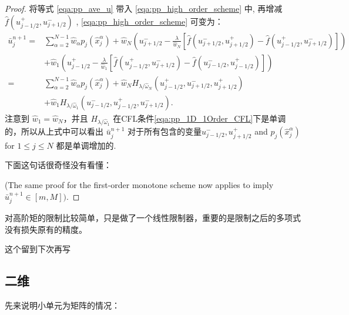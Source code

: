 \documentclass{book}
\begin{document}
\begin{proof}
    将等式 \eqref{eqa:pp_ave_u} 带入 \eqref{eqa:pp_high_order_scheme} 中, 再增减  $\hat{f}\left(u_{j-1 / 2}^{+}, u_{j+1 / 2}^{-}\right)$ , \eqref{eqa:pp_high_order_scheme} 可变为：
    \begin{equation}
        \begin{aligned}
            \bar{u}_{j}^{n+1}= & \sum_{\alpha=2}^{N-1} \hat{w}_{\alpha} p_{j}\left(\hat{x}_{j}^{\alpha}\right)+\hat{w}_{N}\left(u_{j+1 / 2}^{-}-\frac{\lambda}{\hat{w}_{N}}\left[\hat{f}\left(u_{j+1 / 2}^{-}, u_{j+1 / 2}^{+}\right)-\hat{f}\left(u_{j-1 / 2}^{+}, u_{j+1 / 2}^{-}\right)\right]\right) \\
                               & +\hat{w}_{1}\left(u_{j-1 / 2}^{+}-\frac{\lambda}{\hat{w}_{1}}\left[\hat{f}\left(u_{j-1 / 2}^{+}, u_{j+1 / 2}^{-}\right)-\hat{f}\left(u_{j-1 / 2}^{-}, u_{j-1 / 2}^{+}\right)\right]\right)                                                                              \\
            =                  & \sum_{\alpha=2}^{N-1} \hat{w}_{\alpha} p_{j}\left(\hat{x}_{j}^{\alpha}\right)+\hat{w}_{N} H_{\lambda / \hat{\omega}_{N}}\left(u_{j-1 / 2}^{+}, u_{j+1 / 2}^{-}, u_{j+1 / 2}^{+}\right)                                                                                  \\
                               & +\hat{w}_{1} H_{\lambda / \hat{\omega}_{1}}\left(u_{j-1 / 2}^{-}, u_{j-1 / 2}^{+}, u_{j+1 / 2}^{-}\right) .
        \end{aligned}
    \end{equation}
    注意到  $\hat{w}_{1}=\hat{w}_{N}$，并且 $H_{\lambda / \hat{\omega}_{1}}$  在CFL条件\eqref{eqa:pp_1D_1Order_CFL}下是单调的，所以从上式中可以看出 $\bar{u}_{j}^{n+1}$  对于所有包含的变量$u_{j-1 / 2}^{-}, u_{j+1 / 2}^{+}$ and  $p_{j}\left(\hat{x}_{j}^{\alpha}\right)$  for  $1 \leq j \leq N$ 都是单调增加的.

    下面这句话很奇怪没有看懂：

    (The same proof for the first-order monotone scheme now applies to imply  $\bar{u}_{j}^{n+1} \in[m, M])$.
\end{proof}

对高阶矩的限制比较简单，只是做了一个线性限制器，重要的是限制之后的多项式没有损失原有的精度。

\begin{remark}
    这个留到下次再写
\end{remark}
\subsection{二维}
先来说明小单元为矩阵的情况：
\end{document}
